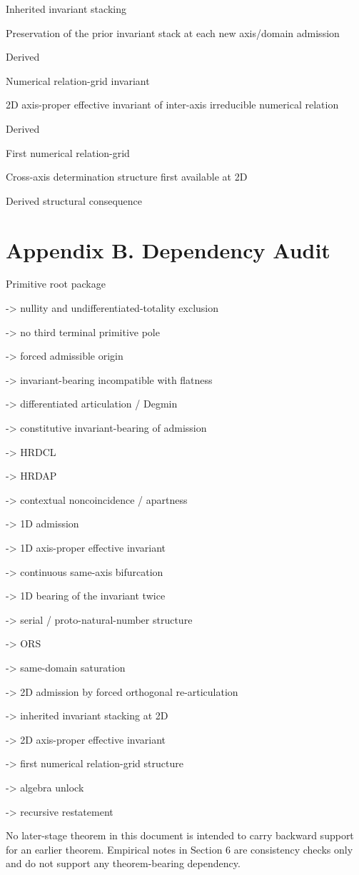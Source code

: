\documentclass[11pt]{article}
\begin{document}
Inherited invariant stacking

Preservation of the prior invariant stack at each new axis/domain admission

Derived

Numerical relation-grid invariant

2D axis-proper effective invariant of inter-axis irreducible numerical relation

Derived

First numerical relation-grid

Cross-axis determination structure first available at 2D

Derived structural consequence

\section{Appendix B. Dependency Audit}\label{appendix-b.-dependency-audit}

Primitive root package

-\textgreater{} nullity and undifferentiated-totality exclusion

-\textgreater{} no third terminal primitive pole

-\textgreater{} forced admissible origin

-\textgreater{} invariant-bearing incompatible with flatness

-\textgreater{} differentiated articulation / Degmin

-\textgreater{} constitutive invariant-bearing of admission

-\textgreater{} HRDCL

-\textgreater{} HRDAP

-\textgreater{} contextual noncoincidence / apartness

-\textgreater{} 1D admission

-\textgreater{} 1D axis-proper effective invariant

-\textgreater{} continuous same-axis bifurcation

-\textgreater{} 1D bearing of the invariant twice

-\textgreater{} serial / proto-natural-number structure

-\textgreater{} ORS

-\textgreater{} same-domain saturation

-\textgreater{} 2D admission by forced orthogonal re-articulation

-\textgreater{} inherited invariant stacking at 2D

-\textgreater{} 2D axis-proper effective invariant

-\textgreater{} first numerical relation-grid structure

-\textgreater{} algebra unlock

-\textgreater{} recursive restatement

No later-stage theorem in this document is intended to carry backward support for an earlier theorem. Empirical notes in Section 6 are consistency checks only and do not support any theorem-bearing dependency.
\end{document}
